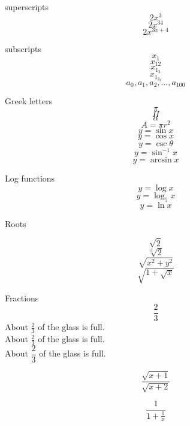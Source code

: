 \documentclass[11pt]{article}
\begin{document}
superscripts
$$2x^3$$
$$2x^{34}$$
$$2x^{3x+4}$$

subscripts
$$x_1$$
$$x_{12}$$
$$x_{1_2}$$
$$x_{1_{2_3}}$$
$$a_0, a_1, a_2, \ldots, a_{100}$$

Greek letters
$$\pi$$
$$\Pi$$
$$\alpha$$
$$A=\pi r^2$$
$$y=\sin x$$
$$y=\cos x$$
$$y=\csc \theta$$
$$y=\sin^{-1} x$$
$$y=\arcsin x$$

Log functions
$$y=\log x$$
$$y=\log_5 x$$
$$y=\ln x$$

Roots

$$\sqrt{2}$$
$$\sqrt[3]{2}$$
$$\sqrt{x^2+y^2}$$
$$\sqrt{ 1+\sqrt{x} }$$

Fractions
$$\frac{2}{3}$$
About $\displaystyle \frac{2}{3}$ of the glass is full.\\[16pt] %
About $\frac{2}{3}$ of the glass is full.\\[6pt] %
About $\dfrac{2}{3}$ of the glass is full. %

$$\frac{\sqrt{x+1}}{\sqrt{x+2}}$$

$$\frac{1}{1 + \frac{1}{x}}$$
\end{document}
